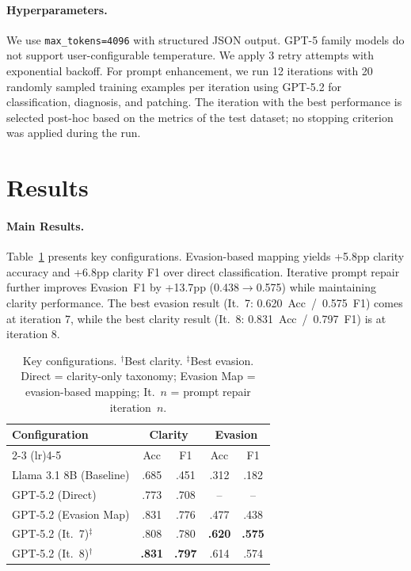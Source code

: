 \documentclass[11pt]{article}
\begin{document}
\paragraph{Hyperparameters.}
We use \texttt{max\_tokens=4096} with structured JSON output.
GPT-5 family models do not support user-configurable temperature.
We apply 3 retry attempts with exponential backoff.
For prompt enhancement, we run 12 iterations with 20 randomly sampled training examples per iteration using GPT-5.2 for classification, diagnosis, and patching.
The iteration with the best performance is selected post-hoc based on the metrics of the test dataset; no stopping criterion was applied during the run.

\section{Results}
\label{sec:results}

\paragraph{Main Results.}
Table~\ref{tab:main} presents key configurations.
Evasion-based mapping yields +5.8pp clarity accuracy and +6.8pp clarity F1 over direct classification.
Iterative prompt repair further improves Evasion~F1 by +13.7pp (0.438$\rightarrow$0.575) while maintaining clarity performance.
The best evasion result (It.~7: 0.620~Acc~/~0.575~F1) comes at iteration 7, while the best clarity result (It.~8: 0.831~Acc~/~0.797~F1) is at iteration 8.

\begin{table}[htbp]
\centering
\small
\begin{tabular}{@{}lcccc@{}}
\toprule
\textbf{Configuration} & \multicolumn{2}{c}{\textbf{Clarity}} & \multicolumn{2}{c}{\textbf{Evasion}} \\
\cmidrule(lr){2-3} \cmidrule(lr){4-5}
 & Acc & F1 & Acc & F1 \\
\midrule
Llama 3.1 8B (Baseline) & .685 & .451 & .312 & .182 \\
GPT-5.2 (Direct) & .773 & .708 & -- & -- \\
GPT-5.2 (Evasion Map) & .831 & .776 & .477 & .438 \\
GPT-5.2 (It.~7)$^\ddagger$ & .808 & .780 & \textbf{.620} & \textbf{.575} \\
GPT-5.2 (It.~8)$^\dagger$ & \textbf{.831} & \textbf{.797} & .614 & .574 \\
\bottomrule
\end{tabular}
\caption{Key configurations. $^\dagger$Best clarity. $^\ddagger$Best evasion. Direct = clarity-only taxonomy; Evasion Map = evasion-based mapping; It.~$n$ = prompt repair iteration~$n$.}
\label{tab:main}
\end{table}
\end{document}
